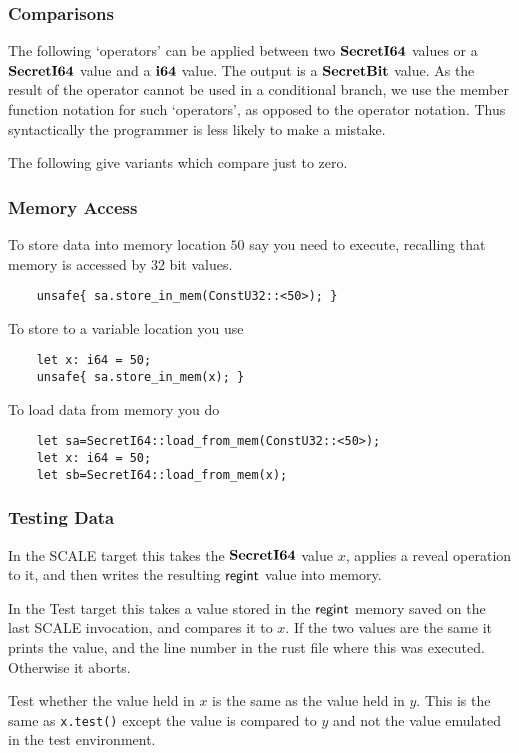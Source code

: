 \subsubsection{Comparisons}
The following `operators' can be applied between two $\mathbf{SecretI64}$ values
or a $\mathbf{SecretI64}$ value and a $\mathbf{i64}$ value. The output is a $\mathbf{SecretBit}$
value.
As the result of the operator cannot be used in a conditional branch,
we use the member function notation for such `operators', as opposed
to the operator notation. Thus syntactically the programmer is less
likely to make a mistake.

\noindent
The following give variants which compare just to zero.

\subsubsection{Memory Access}
To store data into memory location $50$ say you need to execute,
recalling that memory is accessed by $32$ bit values.
\begin{lstlisting}
    unsafe{ sa.store_in_mem(ConstU32::<50>); }
\end{lstlisting}
To store to a variable location you use
\begin{lstlisting}
    let x: i64 = 50;
    unsafe{ sa.store_in_mem(x); }
\end{lstlisting}

To load data from memory you do
\begin{lstlisting}
    let sa=SecretI64::load_from_mem(ConstU32::<50>);
    let x: i64 = 50;
    let sb=SecretI64::load_from_mem(x);
\end{lstlisting}


\subsubsection{Testing Data}
In the SCALE target this takes the $\mathbf{SecretI64}$ value $x$,
applies a reveal operation to it, and then writes the
resulting $\mathsf{regint}$ value into memory.

In the Test target this takes a value stored in the $\mathsf{regint}$
memory saved on the last SCALE invocation, and compares it to
$x$. If the two values are the same it prints the value, and the
line number in the rust file where this was executed.
Otherwise it aborts.

Test whether the value held in $x$ is the same as the value held in $y$.
This is the same as \verb|x.test()| except the value is compared to
$y$ and not the value emulated in the test environment.

